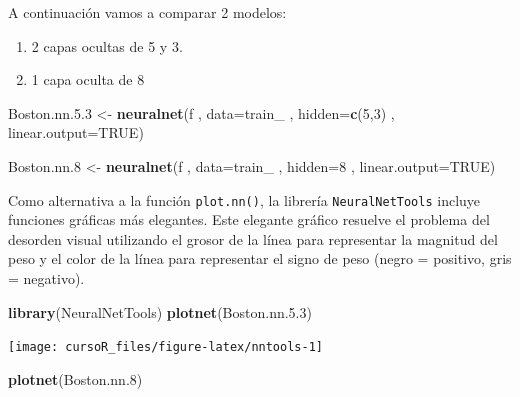 \documentclass[]{book}
\newenvironment{Shaded}{\begin{snugshade}}{\end{snugshade}}
\newcommand{\KeywordTok}[1]{\textcolor[rgb]{0.13,0.29,0.53}{\textbf{#1}}}
\newcommand{\DataTypeTok}[1]{\textcolor[rgb]{0.13,0.29,0.53}{#1}}
\newcommand{\DecValTok}[1]{\textcolor[rgb]{0.00,0.00,0.81}{#1}}
\newcommand{\FloatTok}[1]{\textcolor[rgb]{0.00,0.00,0.81}{#1}}
\newcommand{\StringTok}[1]{\textcolor[rgb]{0.31,0.60,0.02}{#1}}
\newcommand{\OtherTok}[1]{\textcolor[rgb]{0.56,0.35,0.01}{#1}}
\newcommand{\NormalTok}[1]{#1}
\providecommand{\tightlist}{%
  \setlength{\itemsep}{0pt}\setlength{\parskip}{0pt}}
\begin{document}
A continuación vamos a comparar 2 modelos:

\begin{enumerate}
\def\labelenumi{\arabic{enumi}.}
\tightlist
\item
  2 capas ocultas de 5 y 3.
\item
  1 capa oculta de 8
\end{enumerate}

\begin{Shaded}
\begin{Highlighting}[]
\NormalTok{Boston.nn.}\FloatTok{5.3}\NormalTok{ <-}\StringTok{ }\KeywordTok{neuralnet}\NormalTok{(f}
\NormalTok{                , }\DataTypeTok{data=}\NormalTok{train_}
\NormalTok{                , }\DataTypeTok{hidden=}\KeywordTok{c}\NormalTok{(}\DecValTok{5}\NormalTok{,}\DecValTok{3}\NormalTok{)}
\NormalTok{                , }\DataTypeTok{linear.output=}\OtherTok{TRUE}\NormalTok{)}

\NormalTok{Boston.nn.}\DecValTok{8}\NormalTok{ <-}\StringTok{ }\KeywordTok{neuralnet}\NormalTok{(f}
\NormalTok{                , }\DataTypeTok{data=}\NormalTok{train_}
\NormalTok{                , }\DataTypeTok{hidden=}\DecValTok{8}
\NormalTok{                , }\DataTypeTok{linear.output=}\OtherTok{TRUE}\NormalTok{)}
\end{Highlighting}
\end{Shaded}

Como alternativa a la función \texttt{plot.nn()}, la librería
\texttt{NeuralNetTools} incluye funciones gráficas más elegantes. Este
elegante gráfico resuelve el problema del desorden visual utilizando el
grosor de la línea para representar la magnitud del peso y el color de
la línea para representar el signo de peso (negro = positivo, gris =
negativo).

\begin{Shaded}
\begin{Highlighting}[]
\KeywordTok{library}\NormalTok{(NeuralNetTools)}
\KeywordTok{plotnet}\NormalTok{(Boston.nn.}\FloatTok{5.3}\NormalTok{)}
\end{Highlighting}
\end{Shaded}

\begin{center}\texttt{[image: cursoR\_files/figure-latex/nntools-1]} \end{center}

\begin{Shaded}
\begin{Highlighting}[]
\KeywordTok{plotnet}\NormalTok{(Boston.nn.}\DecValTok{8}\NormalTok{)}
\end{Highlighting}
\end{Shaded}
\end{document}
